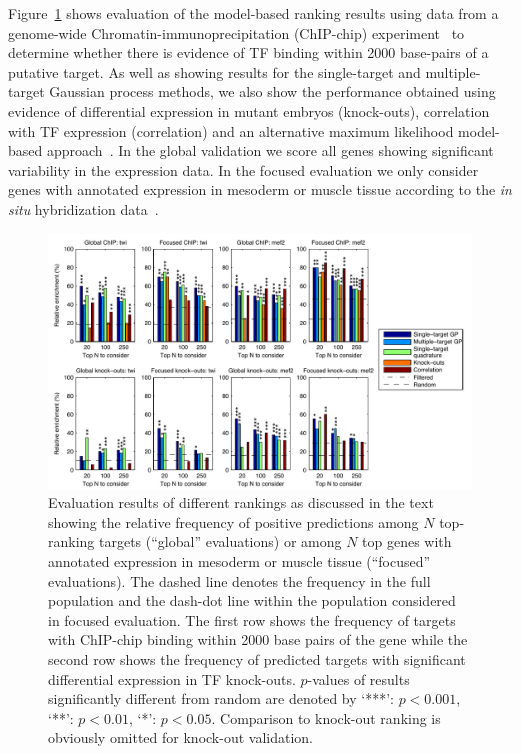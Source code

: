 \documentclass{article}
\begin{document}
Figure~\ref{fig:dros_global_evaluation} shows evaluation of the
model-based ranking results using data from a genome-wide
Chromatin-immunoprecipitation (ChIP-chip)
experiment~\citep{Zinzen2009} to determine whether there is evidence
of TF binding within 2000 base-pairs of a putative target. As well as
showing results for the single-target and multiple-target Gaussian
process methods, we also show the performance obtained using evidence
of differential expression in mutant embryos (knock-outs), correlation
with TF expression (correlation) and an alternative maximum likelihood
model-based approach~\citep[quadrature, see][for
details]{Honkela:modelbased10}. In the global validation we score all
genes showing significant variability in the expression data. In the
focused evaluation we only consider genes with annotated expression in
mesoderm or muscle tissue according to the {\em in situ} hybridization
data~\citep{Tomancak:systematic02}.

\begin{figure}[tb]
  \centering
  \includegraphics[width=12cm]{../disim_pnas/fig3}
  \caption{Evaluation results of different rankings
    \citep[from][]{Honkela:modelbased10} as
    discussed in the text showing the relative frequency of positive
    predictions among $N$ top-ranking targets (``global'' evaluations)
    or among $N$ top genes
    with annotated expression in mesoderm or muscle tissue
    (``focused'' evaluations).
    The dashed line
    denotes the frequency in the full population and the dash-dot
    line within the population considered in focused evaluation.
    The first row shows the frequency of targets with ChIP-chip
    binding within 2000 base pairs of the gene
    while the second row shows the frequency of
    predicted targets with significant differential
    expression in TF knock-outs.
    $p$-values of results significantly different from random are
    denoted by `***': $p <
    0.001$, `**': $p < 0.01$, `*': $p < 0.05$.
    Comparison to knock-out ranking is obviously omitted for knock-out
    validation. \label{fig:dros_global_evaluation}
  }
\end{figure}
\end{document}
